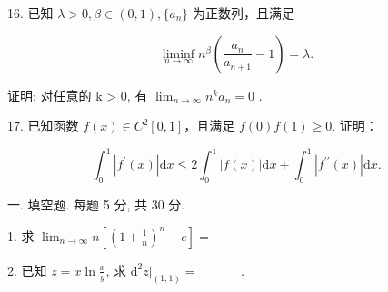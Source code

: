 \documentclass{examcollection}
\renewcommand{\displayformula}[1]{\[#1\]}
\begin{document}
{\begin{minipage}{\textwidth}
16. 已知 $\lambda > 0, \beta \in (0,1), \{a_n\}$ 为正数列，且满足\par
\displayformula{\liminf _ {n \to \infty} n ^ {\beta} \left(\frac {a _ {n}}{a _ {n + 1}} - 1\right) = \lambda .}\par
证明: 对任意的 k > 0, 有  $\lim_{n \to \infty} n^{k} a_{n} = 0$ .\par
17. 已知函数 $f(x) \in C^2[0,1]$，且满足 $f(0)f(1) \geq 0$. 证明：\par
\displayformula{\int_ {0} ^ {1} | f ^ {\prime} (x) | \mathrm{d} x \leq 2 \int_ {0} ^ {1} | f (x) | \mathrm{d} x + \int_ {0} ^ {1} | f ^ {\prime \prime} (x) | \mathrm{d} x.}\par
{}\smallskip
一. 填空题. 每题 5 分, 共 30 分.\par
1. 求 $\lim_{n\to \infty}n\left[\left(1 + \frac{1}{n}\right)^n -e\right] =$\par
2. 已知 $z = x \ln \frac{x}{y}$, 求 $\mathrm{d}^2 z \Big|_{(1,1)} =$ \_\_\_\_.\par
\end{minipage}}
\ifdim\dimexpr\ht\proofbox+\dp\proofbox\relax>\textheight
\noindent\resizebox{!}{\textheight}{\usebox{\proofbox}}\else\noindent\usebox{\proofbox}\fi\clearpage
\end{document}
